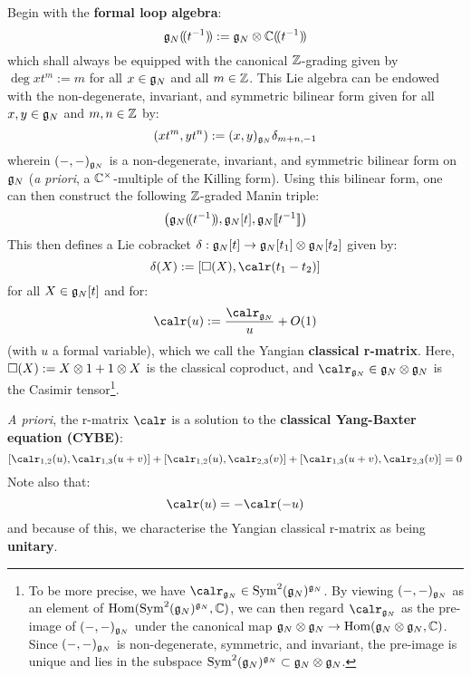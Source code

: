         Begin with the \textbf{formal loop algebra}:
            $$\g_N(\!(t^{-1})\!) := \g_N \tensor \bbC(\!(t^{-1})\!)$$
        which shall always be equipped with the canonical $\mathbb{Z}$-grading given by $\deg xt^m := m$ for all $x \in \mathfrak{g}_N$ and all $m \in \mathbb{Z}$. This Lie algebra can be endowed with the non-degenerate, invariant, and symmetric bilinear form given for all $x, y \in \mathfrak{g}_N$ and $m, n \in \mathbb{Z}$ by:
            $$(xt^m, yt^n) := (x, y)_{\mathfrak{g}_N} \delta_{m + n, -1}$$
        wherein $(-, -)_{\mathfrak{g}_N}$ is a non-degenerate, invariant, and symmetric bilinear form on $\mathfrak{g}_N$ (\textit{a priori}, a $\bbC^{\x}$-multiple of the Killing form). Using this bilinear form, one can then construct the following $\mathbb{Z}$-graded Manin triple:
            $$\left( \mathfrak{g}_N(\!(t^{-1})\!), \mathfrak{g}_N[t], \mathfrak{g}_N[\![t^{-1}]\!] \right)$$
        This then defines a Lie cobracket $\delta: \g_N[t] \to \g_N[t_1] \tensor \g_N[t_2]$ given by:
            $$\delta( X ) := [\Box(X), \calr(t_1 - t_2)]$$
        for all $X \in \mathfrak{g}_N[t]$ and for:
            $$\calr(u) := \frac{\calr_{\g_N}}{u} + O(1)$$
        (with $u$ a formal variable), which we call the Yangian \textbf{classical r-matrix}. Here, $\Box(X) := X \tensor 1 + 1 \tensor X$ is the  classical coproduct, and $\calr_{\g_N} \in \g_N \tensor \g_N$ is the Casimir tensor\footnote{To be more precise, we have $\calr_{\g_N} \in \Sym^2(\g_N)^{\g_N}$. By viewing $(-, -)_{\mathfrak{g}_N}$ as an element of $\operatorname{Hom}( \operatorname{Sym}^2(\mathfrak{g}_N)^{\mathfrak{g}_N}, \mathbb{C} )$, we can then regard $\calr_{\g_N}$ as the pre-image of $(-, -)_{\mathfrak{g}_N}$ under the canonical map $\g_N \tensor \g_N \to \Hom(\g_N \tensor \g_N, \bbC)$. Since $(-, -)_{\mathfrak{g}_N}$ is non-degenerate, symmetric, and invariant, the pre-image is unique and lies in the subspace $\Sym^2(\g_N)^{\g_N} \subset \g_N \tensor \g_N$.}.
        
        \textit{A priori}, the r-matrix $\calr$ is a solution to the \textbf{classical Yang-Baxter equation (CYBE)}:
            \begin{equation} \label{equation: spectral_CYBE}
                [\calr_{1, 2}(u), \calr_{1, 3}(u + v)] + [\calr_{1, 2}(u), \calr_{2, 3}(v)] + [\calr_{1, 3}(u + v), \calr_{2, 3}(v)] = 0
            \end{equation}
        Note also that:
            \begin{equation} \label{equation: spectral_classical_unitarity}
                \calr(u) = -\calr(-u)
            \end{equation}
        and because of this, we characterise the Yangian classical r-matrix as being \textbf{unitary}.
        
